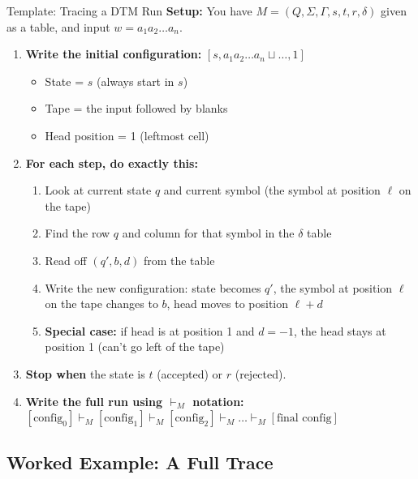 \documentclass[11pt,a4paper]{article}
\newcommand{\blank}{\sqcup}
\begin{document}
\begin{templatebox}{Template: Tracing a DTM Run}
\textbf{Setup:} You have $M = (Q, \Sigma, \Gamma, s, t, r, \delta)$ given as a table, and input $w = a_1 a_2 \ldots a_n$.

\begin{enumerate}
    \item \textbf{Write the initial configuration:} $[s, a_1 a_2 \ldots a_n \blank \ldots, 1]$
    \begin{itemize}
        \item State = $s$ (always start in $s$)
        \item Tape = the input followed by blanks
        \item Head position = 1 (leftmost cell)
    \end{itemize}

    \item \textbf{For each step, do exactly this:}
    \begin{enumerate}[label=(\alph*)]
        \item Look at current state $q$ and current symbol (the symbol at position $\ell$ on the tape)
        \item Find the row $q$ and column for that symbol in the $\delta$ table
        \item Read off $(q', b, d)$ from the table
        \item Write the new configuration: state becomes $q'$, the symbol at position $\ell$ on the tape changes to $b$, head moves to position $\ell + d$
        \item \textbf{Special case:} if head is at position 1 and $d = -1$, the head stays at position 1 (can't go left of the tape)
    \end{enumerate}

    \item \textbf{Stop when} the state is $t$ (accepted) or $r$ (rejected).

    \item \textbf{Write the full run using $\vdash_M$ notation:}\\
    $[\text{config}_0] \vdash_M [\text{config}_1] \vdash_M [\text{config}_2] \vdash_M \ldots \vdash_M [\text{final config}]$
\end{enumerate}
\end{templatebox}

\subsection{Worked Example: A Full Trace}
\end{document}
